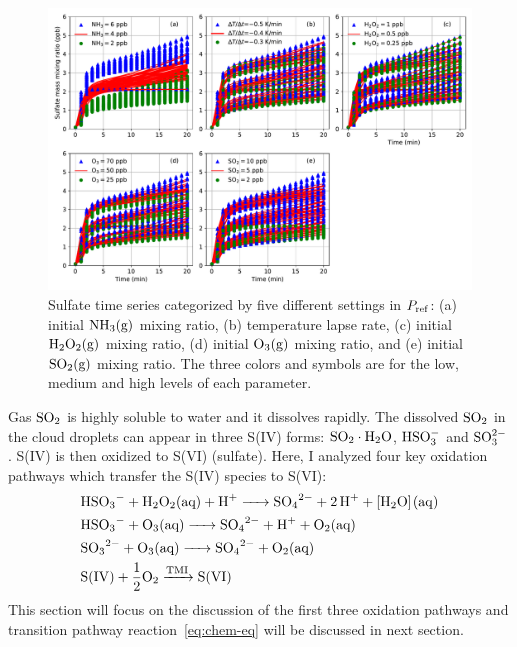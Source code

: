 \documentclass[edeposit,fullpage]{uiucthesis2009}
\begin{document}
\begin{figure}[ht]
    \centering \includegraphics[scale=0.55]{chap2_figs/chap2_fig2_mono_ensemble.pdf}
    \caption{Sulfate time series categorized by five different
      settings in $P_{\rm ref}$: (a) initial $\rm NH_3(g)$ mixing
      ratio, (b) temperature lapse rate, (c) initial $\rm H_2O_2(g)$
      mixing ratio, (d) initial $\rm O_3(g)$ mixing ratio, and (e)
      initial $\rm SO_2(g)$ mixing ratio. The three colors and symbols
      are for the low, medium and high levels of each parameter.}
    \label{chap2:ens_three}
\end{figure}

Gas $\rm SO_2$ is highly soluble to water and it dissolves
rapidly. The dissolved $\rm SO_2$ in the cloud droplets can appear in
three S(IV) forms: $\rm SO_2\cdot H_2O$, $\rm HSO_3^-$ and $\rm
SO_3^{2-}$. S(IV) is then oxidized to S(VI) (sulfate). Here, I
analyzed four key oxidation pathways which transfer the S(IV) species
to S(VI):
\begin{align}
\centering
    &\ce{HSO3^- + H2O2{(aq)} + H^+ -> SO4^{2-} + 2H^+ + [H2O](aq)}\\
    &\ce{HSO3^- + O3{(aq)} -> SO4^{2-} + H^+ + O2{(aq)}} \\
    &\ce{SO3^{2-} + O3{(aq)} -> SO4^{2-} + O2{(aq)}} \\
    \label{eq:chem-eq}
    &\ce{S(IV) + \frac{1}{2}O2 ->[TMI] S(VI)}
\end{align}
This section will focus on the discussion of the first three oxidation
pathways and transition pathway reaction~\ref{eq:chem-eq} will be
discussed in next section.
\end{document}
